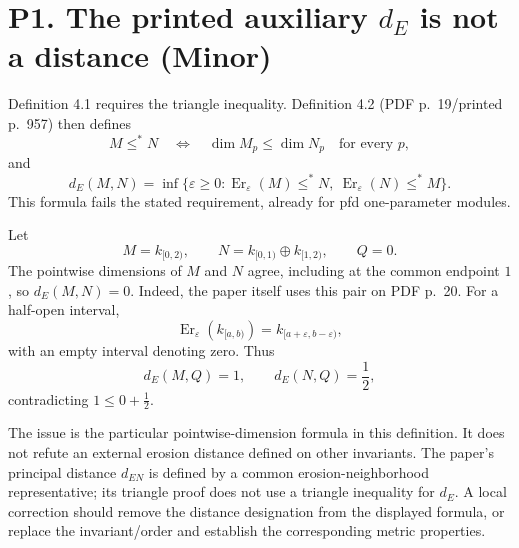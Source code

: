\documentclass[10pt]{article}
\begin{document}
\section*{P1. The printed auxiliary \(d_E\) is not a distance (Minor)}
Definition 4.1 requires the triangle inequality. Definition 4.2 (PDF p. 19/printed p. 957) then defines \[M\leq^*N\quad\Longleftrightarrow\quad
 \dim M_p\leq\dim N_p\quad\text{for every }p,\] and \[d_E(M,N)=\inf\{\varepsilon\geq0:
       \operatorname{Er}_\varepsilon(M)\leq^*N,\ 
       \operatorname{Er}_\varepsilon(N)\leq^*M\}.\] This formula fails the stated requirement, already for pfd one-parameter modules.\par
Let \[M=k_{[0,2)},\qquad
 N=k_{[0,1)}\oplus k_{[1,2)},\qquad Q=0.\] The pointwise dimensions of \(M\) and \(N\) agree, including at the common endpoint \(1\), so \(d_E(M,N)=0\). Indeed, the paper itself uses this pair on PDF p. 20. For a half-open interval, \[\operatorname{Er}_\varepsilon(k_{[a,b)})=
 k_{[a+\varepsilon,b-\varepsilon)},\] with an empty interval denoting zero. Thus \[d_E(M,Q)=1,\qquad d_E(N,Q)=\frac12,\] contradicting \(1\leq 0+\frac12\).\par
The issue is the particular pointwise-dimension formula in this definition. It does not refute an external erosion distance defined on other invariants. The paper’s principal distance \(d_{EN}\) is defined by a common erosion-neighborhood representative; its triangle proof does not use a triangle inequality for \(d_E\). A local correction should remove the distance designation from the displayed formula, or replace the invariant/order and establish the corresponding metric properties.\par
\end{document}
